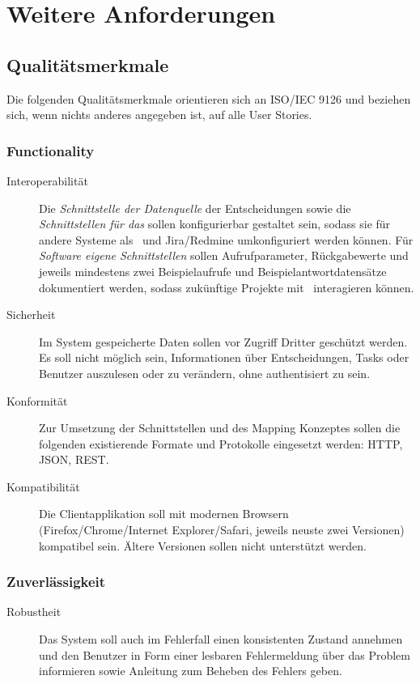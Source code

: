 \section{Weitere Anforderungen}

	\subsection{Qualitätsmerkmale}
		Die folgenden Qualitätsmerkmale orientieren sich an ISO/IEC 9126 \cite{wikipedia_iso/iec_2014} und beziehen sich, wenn nichts anderes angegeben ist, auf alle User Stories.

		\subsubsection{Functionality}
		\begin{description}
			\item[Interoperabilität] Die \textit{Schnittstelle der Datenquelle} der Entscheidungen sowie die \textit{Schnittstellen für das \ppt} sollen konfigurierbar gestaltet sein, sodass sie für andere Systeme als \cdar\ und Jira/Redmine umkonfiguriert werden können. 
			Für \textit{Software eigene Schnittstellen} sollen Aufrufparameter, Rückgabewerte und jeweils mindestens zwei Beispielaufrufe und Beispielantwortdatensätze dokumentiert werden, sodass zukünftige Projekte mit \eeppi\ interagieren können.
			\item[Sicherheit] Im System gespeicherte Daten sollen vor Zugriff Dritter geschützt werden.
			Es soll nicht möglich sein, Informationen über Entscheidungen, Tasks oder Benutzer auszulesen oder zu verändern, 
			ohne authentisiert zu sein.
			\item[Konformität] Zur Umsetzung der Schnittstellen und des Mapping Konzeptes sollen die folgenden existierende Formate und Protokolle eingesetzt werden: HTTP, JSON, REST.
			\item[Kompatibilität] Die Clientapplikation soll mit modernen Browsern (Firefox/Chrome/Internet Explorer/Safari, jeweils neuste zwei Versionen) kompatibel sein. Ältere Versionen sollen nicht unterstützt werden.
		\end{description}
		
		
		\subsubsection{Zuverlässigkeit}
		\begin{description}
			\item[Robustheit] Das System soll auch im Fehlerfall einen konsistenten Zustand annehmen und den Benutzer in Form einer lesbaren Fehlermeldung über das Problem informieren sowie Anleitung zum Beheben des Fehlers geben.
		\end{description}
		

